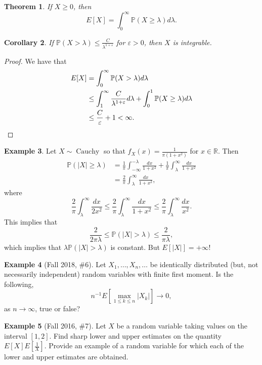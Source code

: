 \documentclass[12pt,reqno]{article}
\theoremstyle{plain}
\newtheorem{theorem}{Theorem}[section]
\newtheorem{cor}[theorem]{Corollary}
\theoremstyle{definition}
\newtheorem{example}[theorem]{Example}
\begin{document}
\begin{theorem}
If $X \geq 0$, then 
\[
E[X] = \int_0^{\infty} \mathbb{P}(X \geq \lambda) d\lambda. 
\]
\end{theorem} 

\begin{cor} 
If $\mathbb{P}(X > \lambda) \leq \frac{C}{\lambda^{1+\varepsilon}}$ for 
$\varepsilon > 0$, then $X$ is integrable. 
\end{cor}
\begin{proof} 
We have that 
\begin{align*} 
E[X] & = \int_0^{\infty} \mathbb{P}(X > \lambda) d\lambda \\ 
     & \leq \int_1^{\infty} \frac{C}{\lambda^{1+\varepsilon}} d\lambda + 
     \int_0^1 \mathbb{P}(X \geq \lambda) d\lambda \\ 
     & \leq \frac{C}{\varepsilon} + 1 < \infty. 
     \qedhere 
\end{align*} 
\end{proof} 

\begin{example}
Let $X \sim \operatorname{Cauchy}$ so that 
$f_X(x) = \frac{1}{\pi(1+x^2)}$ for $x \in \mathbb{R}$. Then 
\begin{align*} 
\mathbb{P}(|X| \geq \lambda) & = 
     \frac{1}{\pi} \int_{-\infty}^{-\lambda} 
     \frac{dx}{1+x^2} + \frac{1}{\pi} \int_{\lambda}^{\infty} 
     \frac{dx}{1+x^2} \\ 
     & = \frac{2}{\pi} \int_{\lambda}^{\infty} \frac{dx}{1+x^2}, 
\end{align*} 
where 
\[
\frac{2}{\pi} \int_{\lambda}^{\infty} \frac{dx}{2x^2} \leq 
     \frac{2}{\pi} \int_{\lambda}^{\infty} \frac{dx}{1+x^2} \leq 
     \frac{2}{\pi} \int_{\lambda}^{\infty} \frac{dx}{x^2}. 
\]
This implies that 
\[
\frac{2}{2\pi\lambda} \leq \mathbb{P}(|X| > \lambda) \leq 
     \frac{2}{\pi\lambda}, 
\]
which implies that $\lambda \mathbb{P}(|X| > \lambda)$ is constant. 
But $E[|X|] = +\infty$! 
\end{example} 

\begin{example}[Fall 2018, \#6]
Let $X_1,\ldots,X_n,\ldots$ be identically distributed (but, not necessarily 
independent) random variables with finite first moment. Is the following, 
\[
n^{-1} E\left[\max_{1 \leq k \leq n} |X_k|\right] \longrightarrow 0, 
\]
as $n \rightarrow \infty$, true or false? 
\end{example} 

\begin{example}[Fall 2016, \#7]
Let $X$ be a random variable taking values on the interval $[1,2]$. 
Find sharp lower and upper estimates on the quantity 
$E[X] E[\frac{1}{X}]$. Provide an example of a random variable for which 
each of the lower and upper estimates are obtained. 
\end{example} 
\end{document}
